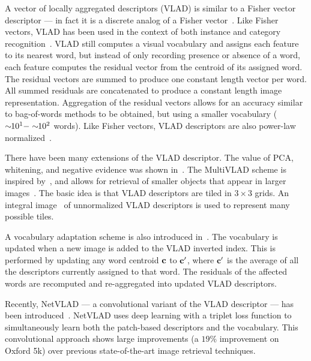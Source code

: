         A vector of locally aggregated descriptors (VLAD) is similar to a Fisher vector descriptor --- in fact it
        is a discrete analog of a Fisher vector~\cite{jegou_aggregating_2010, jegou_aggregating_2012}. Like Fisher
        vectors, VLAD has been used in the context of both instance and category
        recognition~\cite{jegou_negative_2012, delhumeau_revisiting_2013, arandjelovic_all_2013}. VLAD still
        computes a visual vocabulary and assigns each feature to its nearest word, but instead of only recording
        presence or absence of a word, each feature computes the residual vector from the centroid of its assigned
        word. The residual vectors are summed to produce one constant length vector per word. All summed residuals
        are concatenated to produce a constant length image representation. Aggregation of the residual vectors
        allows for an accuracy similar to bag-of-words methods to be obtained, but using a smaller vocabulary
        ($\sim\mkern-6mu 10^{1} - \sim\mkern-6mu 10^{2}$ words). Like Fisher vectors, VLAD descriptors are also power-law
        normalized~\cite{jegou_aggregating_2012}.

        There have been many extensions of the VLAD descriptor. The value of PCA, whitening, and negative evidence
        was shown in~\cite{jegou_negative_2012}. The MultiVLAD scheme is inspired by~\cite{torii_visual_2011}, and
        allows for retrieval of smaller objects that appear in larger images~\cite{arandjelovic_all_2013}. The
        basic idea is that VLAD descriptors are tiled in $3 \times 3$ grids. An integral
        image~\cite{viola_robust_2004} of unnormalized VLAD descriptors is used to represent many possible tiles.

        A vocabulary adaptation scheme is also introduced in~\cite{arandjelovic_all_2013}. The vocabulary is
        updated when a new image is added to the VLAD inverted index. This is performed by updating any word
        centroid $\mathbf{c}$ to $\mathbf{c}'$, where $\mathbf{c}'$ is the average of all the descriptors currently assigned to that
        word. The residuals of the affected words are recomputed and re-aggregated into updated VLAD descriptors.

        Recently, NetVLAD --- a convolutional variant of the VLAD descriptor --- has been
        introduced~\cite{arandjelovic_netvlad_2016,radenovic_cnn_2016}. NetVLAD uses deep learning with a triplet
        loss function to simultaneously learn both the patch-based descriptors and the vocabulary. This
        convolutional approach shows large improvements (a $19\percent$ improvement on Oxford 5k) over previous
        state-of-the-art image retrieval techniques.

